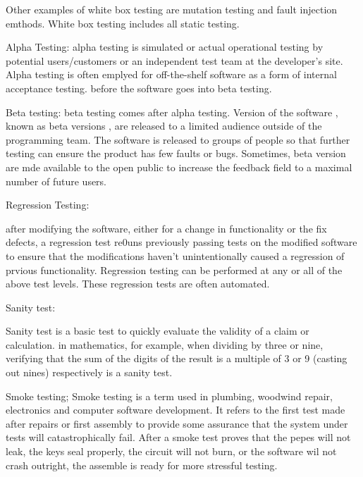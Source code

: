 Other examples of white box testing are mutation testing and fault injection emthods. 
White box testing includes all static testing. 


Alpha Testing: alpha testing is simulated or actual operational testing by potential users/customers or an independent test team at the developer's site. 
Alpha testing is often emplyed for off-the-shelf software as a form of internal acceptance testing. before the software goes into beta testing. 

Beta testing: 
beta testing comes after alpha testing. Version of the software , known as beta versions , are released to a limited audience outside of the programming team. The software is 
released to groups of people so that further testing can ensure the product has few faults or bugs. Sometimes, beta version are mde available to the open public to increase the feedback field to a maximal number of future users. 

Regression Testing:

after modifying the software, either for a change in functionality or the fix defects, a regression test re0uns previously passing tests on the modified 
software to ensure that the modifications haven't unintentionally caused a regression of prvious functionality. Regression testing can be performed at any or all of the 
above test levels. These regression tests are often automated. 

Sanity test: 

Sanity test is a basic test to quickly evaluate the validity of a claim or calculation. in mathematics, for example, when dividing by three or nine, verifying that the sum of the digits of the result is 
a multiple of 3 or 9 (casting out nines) respectively is a sanity test. 

Smoke testing; 
Smoke testing is a term used in plumbing, woodwind repair, electronics and computer software development. It refers to the first test made after repairs or first assembly to 
provide some assurance that the system under tests will catastrophically fail. After a smoke test proves that the pepes will not leak, the keys seal properly, the circuit will 
not burn, or the software wil not crash outright, the assemble is ready for more stressful testing. 



